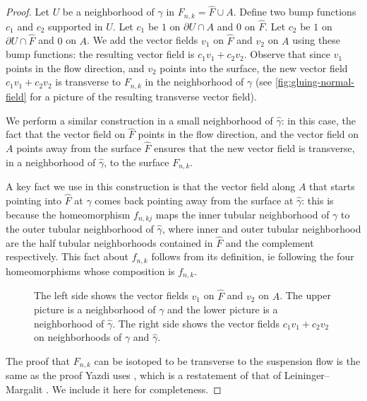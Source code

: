 \begin{proof}
Let $U$ be a neighborhood of $\gamma$ in $F_{n,k}=\widehat{F}\cup A$. Define two bump functions $c_1$ and $c_2$ supported in $U$.  Let $c_1$ be $1$ on $\partial U\cap A$ and $0$ on $\widehat{F}$. Let $c_2$ be $1$ on $\partial U\cap \widehat{F}$ and $0$ on $A$.
  We add the vector fields $v_1$ on $\widehat{F}$ and $v_2$ on $A$ using these bump functions: the resulting vector field is $c_1 v_1 + c_2 v_2$.
  Observe that since $v_1$ points in the flow direction, and $v_2$ points into the surface, the new vector field $c_1 v_1 + c_2 v_2$ is transverse to $F_{n,k}$ in the neighborhood of $\gamma$ (see \autoref{fig:gluing-normal-field} for a picture of the resulting transverse vector field).

  We perform a similar construction in a small neighborhood of $\widehat{\gamma}$: in this case, the fact that the vector field on $\widehat{F}$ points in the flow direction, and the vector field on $A$ points away from the surface $\widehat{F}$ ensures that the new vector field is transverse, in a neighborhood of $\widehat{\gamma}$, to the surface $F_{n,k}$.

  A key fact we use in this construction is that the vector field along $A$ that starts pointing into $\widehat{F}$ at $\gamma$ comes back pointing away from the surface at $\widehat{\gamma}$: this is because the homeomorphism $f_{n,kj}$ maps the inner tubular neighborhood of $\gamma$ to the outer tubular neighborhood of $\widehat{\gamma}$, where inner and outer tubular neighborhood are the half tubular neighborhoods contained in $\widehat{F}$ and the complement respectively.
  This fact about $f_{n,k}$ follows from its definition, ie following the four homeomorphisms whose composition is $f_{n,k}$.
\begin{figure}[t]
  \centering
  \caption{The left side shows the vector fields $v_1$ on $\widehat{F}$ and $v_2$ on $A$.  The upper picture is a neighborhood of $\gamma$ and the lower picture is a neighborhood of $\widehat{\gamma}$.  The right side shows the vector fields $c_1v_1+c_2v_2$ on neighborhoods of $\gamma$ and $\widehat{\gamma}$.}
  \label{fig:gluing-normal-field}
\end{figure}


  The proof that $F_{n,k}$ can be isotoped to be transverse to the suspension flow is the same as the
  proof Yazdi uses \cite{yazdi2018pseudo}, which is a restatement of that of Leininger--Margalit \cite{leininger2013number}. We include it here for completeness.


\end{proof}
